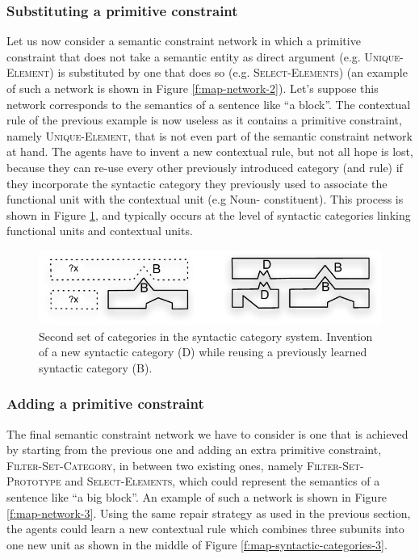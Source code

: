 \subsubsection*{Substituting a primitive constraint}

Let us now consider a semantic constraint network in which a primitive
constraint that does not take a semantic entity as direct argument
(e.g. \textsc{Unique-Element}) is substituted by one that does so
(e.g. \textsc{Select-Ele\-ments}) (an example of such a network is shown
in Figure \ref{f:map-network-2}). Let's suppose this network
corresponds to the semantics of a sentence like ``a block''. The
contextual rule of the previous example is now useless as it contains
a primitive constraint, namely \textsc{Unique-Element}, that is not
even part of the semantic constraint network at hand. The agents have
to invent a new contextual rule, but not all hope is lost, because
they can re-use every other previously introduced category (and rule)
if they incorporate the syntactic category they previously used to
associate the functional unit with the contextual unit (e.g Noun-
constituent). This process is shown in Figure
\ref{f:map-syntactic-categories-2}, and typically occurs at the level
of syntactic categories linking functional units and contextual units.

\begin{figure}[htbp]
  \begin{center}
    \includegraphics[width=.7\textwidth]{./composition/figures/mapping-2.pdf}
    \caption[Second set of categories in the syntactic category
    system]{Second set of categories in the syntactic category
      system. Invention of a new syntactic category (D) while reusing
      a previously learned syntactic category (B).}
    \label{f:map-syntactic-categories-2}
  \end{center}
\end{figure}

\subsubsection*{Adding a primitive constraint}

The final semantic constraint network we have to consider is one that
is achieved by starting from the previous one and adding an extra
primitive constraint, \textsc{Filter-Set-Category}, in between two
existing ones, namely \textsc{Filter-Set-Prototype} and
\textsc{Select-Elements}, which could represent the semantics of a
sentence like ``a big block''. An example of such a network is shown
in Figure \ref{f:map-network-3}. Using the same repair strategy as
used in the previous section, the agents could learn a new contextual
rule which combines three subunits into one new unit as shown in the
middle of Figure \ref{f:map-syntactic-categories-3}.

